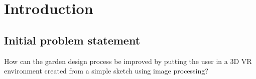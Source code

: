 \chapter{Introduction}

	\section{Initial problem statement}
	How can the garden design process be improved by putting the user in a 3D VR environment created from a simple sketch using image processing?
	